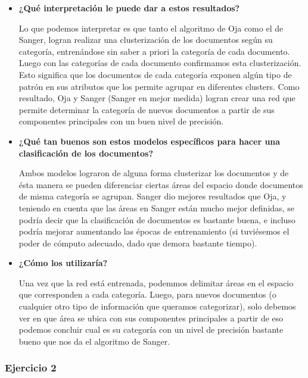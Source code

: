 \begin{itemize}

\item \textbf{¿Qué interpretación le puede dar a estos resultados?} 

Lo que podemos interpretar es que tanto el algoritmo de Oja como el de Sanger, logran realizar una clusterización de los documentos según 
su categoría, entrenándose sin saber a priori la categoría de cada documento. Luego con las categorías de cada documento confirmamos esta 
clusterización. Esto significa que los documentos de cada categoría exponen algún tipo de patrón en sus atributos que los permite agrupar en 
diferentes clusters. Como resultado, Oja y Sanger (Sanger en mejor medida) logran crear una red que permite determinar la categoría de nuevos
documentos a partir de sus componentes principales con un buen nivel de precisión.

\item \textbf{¿Qué tan buenos son estos modelos específicos para hacer una clasificación de los documentos?}

Ambos modelos lograron de alguna forma clusterizar los documentos y de ésta manera se pueden diferenciar ciertas áreas del espacio
donde documentos de misma categoría se agrupan. Sanger dio mejores resultados que Oja, y teniendo en cuenta que las áreas en Sanger
están mucho mejor definidas, se podría decir que la clasificación de documentos es bastante buena, e incluso podría mejorar aumentando
las épocas de entrenamiento (si tuviésemos el poder de cómputo adecuado, dado que demora bastante tiempo).

\item \textbf{¿Cómo los utilizaría?}

Una vez que la red está entrenada, podemmos delimitar áreas en el espacio que corresponden a cada categoría. Luego, para nuevos documentos
(o cualquier otro tipo de información que queramos categorizar), solo debemos ver en que área se ubica con sus componentes principales a partir de
eso podemos concluir cual es su categoría con un nivel de precisión bastante bueno que nos da el algoritmo de Sanger.

\end{itemize}

\subsubsection{Ejercicio 2}

